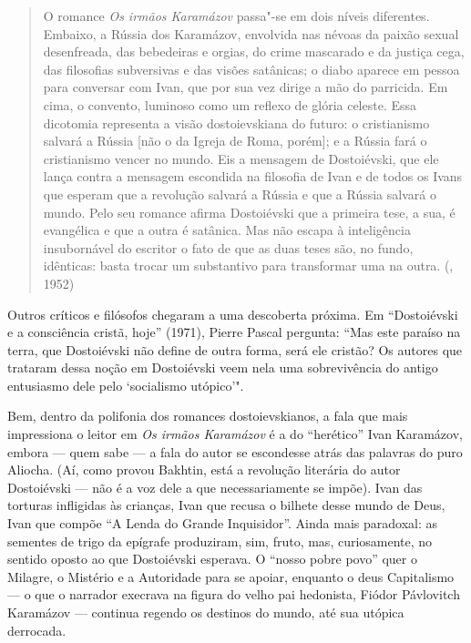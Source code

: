 {{\begin{quote}
O romance \emph{Os irmãos Karamázov} passa"-se em dois níveis diferentes. Embaixo, a Rússia dos Karamázov, envolvida nas névoas da paixão sexual desenfreada, das bebedeiras e orgias, do crime mascarado e da justiça cega, das filosofias subversivas e das visões satânicas; o diabo aparece em pessoa para conversar com Ivan, que por sua vez dirige a mão do parricida. Em cima, o convento, luminoso como um reflexo de glória celeste. Essa dicotomia representa a visão dostoievskiana do futuro: o cristianismo salvará a Rússia [não o da Igreja de Roma, porém]; e a Rússia fará o cristianismo vencer no mundo. Eis a mensagem de Dostoiévski, que ele lança contra a mensagem escondida na filosofia de Ivan e de todos os Ivans que esperam que a revolução salvará a Rússia e que a Rússia salvará o mundo. Pelo seu romance afirma Dostoiévski que a primeira tese, a sua, é evangélica e que a outra é satânica. Mas não escapa à inteligência insubornável do escritor o fato de que as duas teses são, no fundo, idênticas: basta trocar um substantivo para transformar uma na outra. (, 1952) 
\end{quote}

Outros críticos e filósofos chegaram a uma descoberta próxima. Em
``Dostoiévski e a consciência cristã, hoje'' (1971), Pierre Pascal
pergunta: ``Mas este paraíso na terra, que Dostoiévski não define
de outra forma, será ele cristão? Os autores que trataram dessa noção em
Dostoiévski veem nela uma sobrevivência do antigo entusiasmo dele pelo
`socialismo utópico'".

Bem, dentro da polifonia dos romances dostoievskianos, a fala que mais impressiona o leitor em \emph{Os irmãos Karamázov} é a do ``herético'' Ivan Karamázov, embora --- quem sabe --- a fala do autor se escondesse atrás das palavras do puro Aliocha. (Aí, como provou Bakhtin, está a revolução literária do autor Dostoiévski --- não é a voz dele a que necessariamente se impõe). Ivan das torturas infligidas às crianças, Ivan que recusa o bilhete desse mundo de Deus, Ivan que compõe ``A Lenda do Grande Inquisidor''. Ainda mais paradoxal: as sementes de trigo da epígrafe produziram, sim, fruto, mas, curiosamente, no sentido oposto ao
que Dostoiévski esperava. O ``nosso pobre povo'' quer o Milagre, o
Mistério e a Autoridade para se apoiar, enquanto o deus
Capitalismo --- o que o narrador execrava na figura do velho
pai hedonista, Fiódor Pávlovitch Karamázov --- continua regendo
os destinos do mundo, até sua utópica derrocada.

}}
